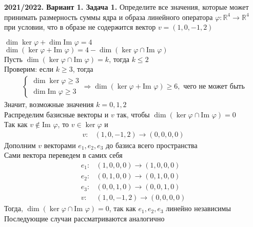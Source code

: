 \documentclass[a4paper]{article}
\newcommand{\im}{\text{Im }}
\begin{document}
\newpage

\begin{tcolorbox}[colback=blue!20!white, colframe=black!100!black]
    \textbf{2021/2022. Вариант 1. Задача 1.} Определите все значения, которые может принимать размерность суммы ядра и образа линейного оператора $\varphi:\mathbb{R}^4\rightarrow\mathbb{R}^4$ при условии, что в образе не содержится вектор $v=(1, 0, -1, 2)$
\end{tcolorbox}
$\dim{\ker{\varphi}}+\dim{\im{\varphi}}=4$\\[2mm]
\indent $\dim{(\ker{\varphi}+\im{\varphi})}=4-\dim{(\ker{\varphi}\cap\im{\varphi})}$\\[2mm]
\indent Пусть $\dim{(\ker{\varphi}\cap\im{\varphi})}=k$, тогда $k\leqslant2$\\[2mm]
\indent Проверим: если $k\geqslant3$, тогда 
$$\begin{aligned}
    \begin{cases}
    \dim{\ker{\varphi}}\geqslant3\\
    \dim{\im{\varphi}}\geqslant3
    \end{cases}\Longrightarrow\dim{(\ker{\varphi}+\im{\varphi})}\geqslant6,\text{ чего не может быть}
\end{aligned}$$
\indent Значит, возможные значения $k=0,1,2$\\[2mm]
\indent Распределим базисные векторы и $v$ так, чтобы $\dim{(\ker{\varphi}\cap\im{\varphi})}=0$\\[2mm]
\indent Так как $v\notin\im{\varphi}$, то $v\in\ker{\varphi}$ и 
$$\begin{aligned}
    v:&(1, 0, -1, 2)\longrightarrow(0, 0, 0, 0)
\end{aligned}$$
\indent Дополним $v$ векторами $e_1, e_2, e_3$ до базиса всего пространства\\[2mm]
\indent Сами вектора переведем в самих себя
$$\begin{aligned}
    e_1:&(1, 0, 0, 0)\longrightarrow(1, 0, 0, 0)\\
    e_2:&(0, 1, 0, 0)\longrightarrow(0, 1, 0, 0)\\
    e_3:&(0, 0, 1, 0)\longrightarrow(0, 0, 1, 0)\\
    v:&(1, 0, -1, 2)\longrightarrow(0, 0, 0, 0)
\end{aligned}$$
\indent Тогда, $\dim{(\ker{\varphi}\cap\im{\varphi})}=0$, так как $e_1, e_2, e_3$ линейно независимы\\[2mm]
\indent Последующие случаи рассматриваются аналогично

\newpage
\end{document}
